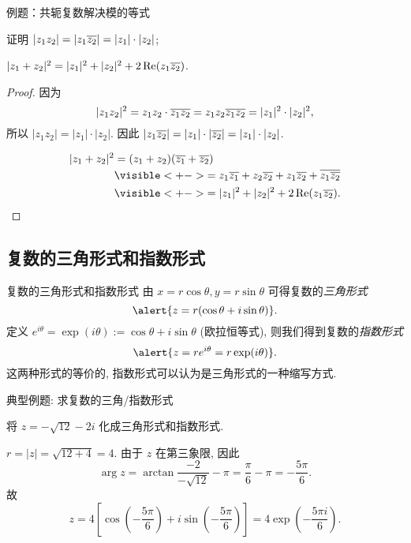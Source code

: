 \begin{frame}{例题：共轭复数解决模的等式}
\onslide<+->
\begin{example}
证明  $|z_1z_2|=|z_1\overline{z_2}|=|z_1|\cdot|z_2|$;

 $|z_1+z_2|^2=|z_1|^2+|z_2|^2+2\operatorname{Re}(z_1\overline{z_2})$.
\end{example}
\onslide<+->
\begin{proof}
 因为
\[|z_1z_2|^2=z_1z_2\cdot\overline{z_1z_2}
=z_1z_2\overline{z_1}\overline{z_2}=|z_1|^2\cdot|z_2|^2,\]
\onslide<+->
所以 $|z_1z_2|=|z_1|\cdot|z_2|$.
\onslide<+->
因此 $|z_1\overline{z_2}|=|z_1|\cdot|\overline{z_2}|=|z_1|\cdot|z_2|$.

\vspace{-0.6\baselineskip}
\begin{align*}
|z_1+z_2|^2&=(z_1+z_2)(\ov{z_1}+\ov{z_2})\\
&\visible<+->{=z_1\ov{z_1}+z_2\ov{z_2}+z_1\ov{z_2}+\ov{z_1\ov{z_2}}}\\
&\visible<+->{=|z_1|^2+|z_2|^2+2\Re(z_1\ov{z_2}).\qedhere}
\end{align*}
\vspace{-1.5\baselineskip}
\end{proof}
\end{frame}


\subsection{复数的三角形式和指数形式}
\begin{frame}{复数的三角形式和指数形式}
\onslide<+->
由 $x=r\cos\theta,y=r\sin\theta$ 可得复数的\emph{三角形式}
\[\alert{z=r(\cos\theta+i\sin\theta)}.\]
\onslide<+->
定义 $e^{i\theta}=\exp(i\theta):=\cos\theta+i\sin\theta$ (欧拉恒等式),
\onslide<+->
则我们得到复数的\emph{指数形式}
\[\alert{z=re^{i\theta}=r\exp(i\theta)}.\]
\onslide<+->
这两种形式的等价的, 指数形式可以认为是三角形式的一种缩写方式.
\end{frame}


\begin{frame}{典型例题: 求复数的三角/指数形式}
\onslide<+->
\begin{example}
将 $z=-\sqrt{12}-2i$ 化成三角形式和指数形式.
\end{example}
\onslide<+->
\begin{solution}
$r=|z|=\sqrt{12+4}=4$.
\onslide<+->
由于 $z$ 在第三象限,
\onslide<+->
因此
\[\arg z=\arctan\frac{-2}{-\sqrt{12}}-\pi=\frac\pi6-\pi=-\frac{5\pi}6.\]
\onslide<+->
故
\[z=4\left[\cos\left(-\frac{5\pi}6\right)+i\sin\left(-
\frac{5\pi}6\right)\right]=4\exp\left(-\frac{5\pi i}6\right).\]
\end{solution}
\end{frame}



